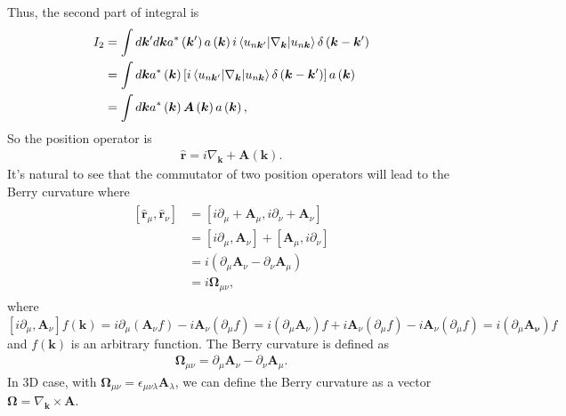 \documentclass[12pt, oneside]{article}
\newcommand{\pr}{\prime}
\newcommand{\pa}{\partial}
\newcommand{\p}[1]{\left(#1\right)}
\newcommand{\bb}[1]{\left[#1\right]}
\numberwithin{equation}{subsection}
\begin{document}
Thus, the second part of integral is 
\begin{align}
	\begin{split}
		I_2 & = \int d \bm{k}^\pr d \bm{k} a^{*}\p{\bm{k}^\pr} a \p{\bm{k}} i \braket{ u_{n \bm{k}^\pr} | \nabla_{\bm{k}} |  u_{n \bm{k}}} \delta \p{\bm{k}-\bm{k}^\pr} \\
		& = \int d \bm{k}  a^{*}\p{\bm{k}} \bb{i  \braket{ u_{n \bm{k}^\pr} | \nabla_{\bm{k}} |  u_{n \bm{k}}} \delta \p{\bm{k}-\bm{k}^\pr} } a \p{\bm{k}} \\
		& = \int d \bm{k}  a^{*}\p{\bm{k}} \bm{A} \p{\bm{k}} a \p{\bm{k}},
	\end{split}
\end{align}
So the position operator is 
\begin{align}
	\boxed{\hat{\bm{r}} = i \nabla_{\bm{k}} + \bm{A} \p{\bm{k}}}.
\end{align}
It's natural to see that the commutator of two position operators will lead to the Berry curvature where
\begin{align}
	\begin{split}
		\bb{\hat{\bm{r}}_\mu, \hat{\bm{r}}_\nu} & =  \bb{i \pa_{\mu} + \bm{A}_{\mu}, i \pa_{\nu} + \bm{A}_{\nu}} \\
		& = \bb{i \partial_{\mu}, \bm{A}_\nu} + \bb{\bm{A}_\mu, i \partial_\nu} \\
		& = i \p{\partial_{\mu} \bm{A}_\nu - \partial_{\nu} \bm{A}_\mu}\\
		& = i \bm{\Omega}_{\mu \nu},
	\end{split}
\end{align}
where \(\bb{i \pa_\mu, \bm{A}_\nu} f\p{\bm{k}} = i \pa_\mu \p{\bm{A}_\nu f} - i \bm{A}_\nu \p{\pa_{\mu} f} = i \p{\pa_\mu \bm{A}_\nu } f + i \bm{A}_\nu \p{\pa_\mu f} - i \bm{A}_\nu \p{\pa_{\mu} f} = i \p{\pa_\mu \bm{A_\nu}} f\) and \(f \p{\bm{k}}\) is an arbitrary function. The Berry curvature is defined as
\begin{align}
	\bm{\Omega}_{\mu \nu} = \partial_{\mu} \bm{A}_\nu - \partial_{\nu} \bm{A}_\mu.
\end{align}
In 3D case, with \(\bm{\Omega}_{\mu \nu} = \epsilon_{\mu \nu \lambda} \bm{A}_\lambda\),  we can define the Berry curvature as a vector \(\bm{\Omega} = \nabla_{\bm{k}} \times \bm{A}\).
\end{document}
